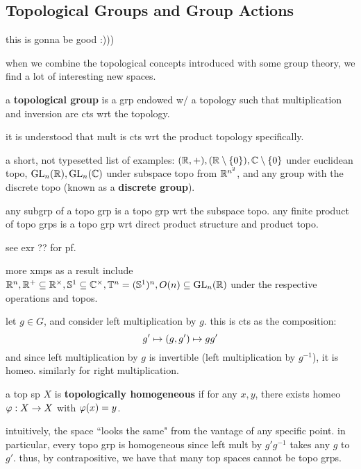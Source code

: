\subsection{Topological Groups and Group Actions}
this is gonna be good :)))

when we combine the topological concepts introduced with some group theory, we
find a lot of interesting new spaces.
\begin{defn}
    a \textbf{topological group} is a grp endowed w/ a topology such that
    multiplication and inversion are cts wrt the topology.
\end{defn}
it is understood that mult is cts wrt the product topology specifically.

\begin{xmp}[source=Primary Source Material]
    a short, not typesetted list of examples: $(\mathbb{R},+),(\mathbb{R}\setminus\left\{{0}\right\}),
    \mathbb{C}\setminus\left\{{0}\right\}$ under euclidean topo, $\operatorname{GL}_{n}(\mathbb{R}),\operatorname{GL}_{n}(\mathbb{C})$
    under subspace topo from $\mathbb{R}^{n^{2}}$, and any group with the discrete topo
    (known as a \textbf{discrete group}).
\end{xmp}

\begin{prop}
    any subgrp of a topo grp is a topo grp wrt the subspace topo. any finite
    product of topo grps is a topo grp wrt direct product structure and product
    topo.
\end{prop}
see exr ?? for pf.

\newpage
\begin{xmp}[source=Primary Source Material]
    more xmps as a result include $\mathbb{R}^{n}, \mathbb{R}^{+}\subseteq\mathbb{R}^{\times},
    \mathbb{S}^{1}\subseteq\mathbb{C}^{\times},\mathbb{T}^{n}=(\mathbb{S}^{1})^{n},
    O(n)\subseteq\operatorname{GL}_{n}(\mathbb{R})$ under the respective operations and topos.
\end{xmp}
let $g\in G$, and consider left multiplication by $g$. this is cts as the
composition:
\begin{equation*}
    g' \mapsto (g, g') \mapsto gg'
\end{equation*}
and since left multiplication by $g$ is invertible (left multiplication by
$g^{-1}$), it is homeo. similarly for right multiplication.

\begin{defn}
    a top sp $X$ is \textbf{topologically homogeneous} if for any $x,y$, there
    exists homeo $\varphi:X\rightarrow X$ with $\varphi(x)=y$.
\end{defn}
intuitively, the space ``looks the same" from the vantage of any specific point.
in particular, every topo grp is homogeneous since left mult by $g'g^{-1}$ takes
any $g$ to $g'$. thus, by contrapositive, we have that many top spaces cannot be
topo grps.


